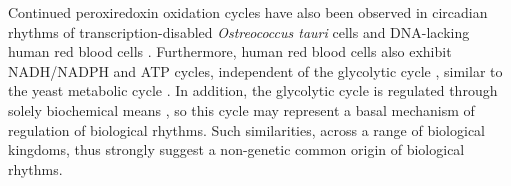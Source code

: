 Continued peroxiredoxin oxidation cycles have also been observed in circadian rhythms of transcription-disabled \textit{Ostreococcus tauri} cells \parencite{oneillCircadianRhythmsPersist2011} and DNA-lacking human red blood cells \parencite{oneillCircadianClocksHuman2011}.
Furthermore, human red blood cells also exhibit NADH/NADPH and ATP cycles, independent of the glycolytic cycle \parencite{oneillCircadianClocksHuman2011}, similar to the yeast metabolic cycle \parencite{papagiannakisAutonomousMetabolicOscillations2017}.
In addition, the glycolytic cycle is regulated through solely biochemical means \parencite{ghoshOscillationsGlycolyticIntermediates1964,higginsChemicalMechanismOscillation1964}, so this cycle may represent a basal mechanism of regulation of biological rhythms.
Such similarities, across a range of biological kingdoms, thus strongly suggest a non-genetic common origin of biological rhythms.
